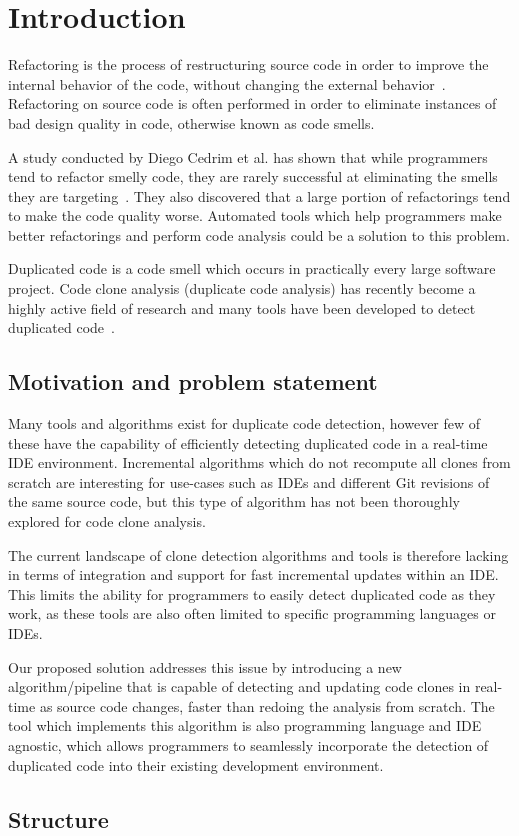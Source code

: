 \chapter{Introduction}

Refactoring is the process of restructuring source code in order to improve the internal behavior
of the code, without changing the external behavior~\cite[9]{fowlerrefactoring}.
Refactoring on source code is often performed in order to eliminate instances of bad
design quality in code, otherwise known as code smells.

A study conducted by Diego Cedrim et al. has shown that while programmers tend to refactor
smelly code, they are rarely successful at eliminating the smells they are
targeting~\cite{Rohit_Gheyi_Impact}. They also discovered that a large portion of
refactorings tend to make the code quality worse. Automated tools which help programmers
make better refactorings and perform code analysis could be a solution to this problem.

Duplicated code is a code smell which occurs in practically every large software project.
Code clone analysis (duplicate code analysis) has recently become a highly active field
of research and many tools have been developed to detect duplicated
code~\cite[7]{Inoue_introduction_to_cc}. 

\section{Motivation and problem statement}

Many tools and algorithms exist for duplicate code detection, however few of these have
the capability of efficiently detecting duplicated code in a real-time IDE environment.
Incremental algorithms which do not recompute all clones from scratch are interesting for
use-cases such as IDEs and different Git revisions of the same source code, but this type of
algorithm has not been thoroughly explored for code clone analysis.

The current landscape of clone detection algorithms and tools is therefore lacking in
terms of integration and support for fast incremental updates within an IDE. This limits
the ability for programmers to easily detect duplicated code as they work, as these tools
are also often limited to specific programming languages or IDEs.

Our proposed solution addresses this issue by introducing a new algorithm/pipeline that is
capable of detecting and updating code clones in real-time as source code changes, faster
than redoing the analysis from scratch. The tool which implements this algorithm is also
programming language and IDE agnostic, which allows programmers to seamlessly incorporate
the detection of duplicated code into their existing development environment.

\section{Structure}
